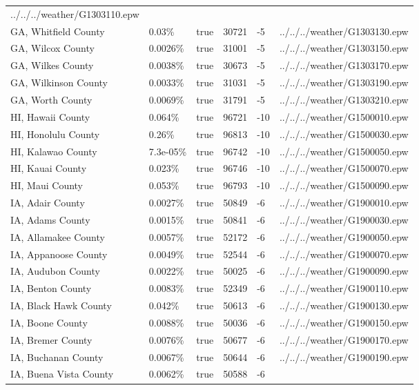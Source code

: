 \begin{longtable}[]{@{}llllll@{}}
../../../weather/G1303110.epw \\
GA, Whitfield County & 0.03\% & true & 30721 & -5 &
../../../weather/G1303130.epw \\
GA, Wilcox County & 0.0026\% & true & 31001 & -5 &
../../../weather/G1303150.epw \\
GA, Wilkes County & 0.0038\% & true & 30673 & -5 &
../../../weather/G1303170.epw \\
GA, Wilkinson County & 0.0033\% & true & 31031 & -5 &
../../../weather/G1303190.epw \\
GA, Worth County & 0.0069\% & true & 31791 & -5 &
../../../weather/G1303210.epw \\
HI, Hawaii County & 0.064\% & true & 96721 & -10 &
../../../weather/G1500010.epw \\
HI, Honolulu County & 0.26\% & true & 96813 & -10 &
../../../weather/G1500030.epw \\
HI, Kalawao County & 7.3e-05\% & true & 96742 & -10 &
../../../weather/G1500050.epw \\
HI, Kauai County & 0.023\% & true & 96746 & -10 &
../../../weather/G1500070.epw \\
HI, Maui County & 0.053\% & true & 96793 & -10 &
../../../weather/G1500090.epw \\
IA, Adair County & 0.0027\% & true & 50849 & -6 &
../../../weather/G1900010.epw \\
IA, Adams County & 0.0015\% & true & 50841 & -6 &
../../../weather/G1900030.epw \\
IA, Allamakee County & 0.0057\% & true & 52172 & -6 &
../../../weather/G1900050.epw \\
IA, Appanoose County & 0.0049\% & true & 52544 & -6 &
../../../weather/G1900070.epw \\
IA, Audubon County & 0.0022\% & true & 50025 & -6 &
../../../weather/G1900090.epw \\
IA, Benton County & 0.0083\% & true & 52349 & -6 &
../../../weather/G1900110.epw \\
IA, Black Hawk County & 0.042\% & true & 50613 & -6 &
../../../weather/G1900130.epw \\
IA, Boone County & 0.0088\% & true & 50036 & -6 &
../../../weather/G1900150.epw \\
IA, Bremer County & 0.0076\% & true & 50677 & -6 &
../../../weather/G1900170.epw \\
IA, Buchanan County & 0.0067\% & true & 50644 & -6 &
../../../weather/G1900190.epw \\
IA, Buena Vista County & 0.0062\% & true & 50588 & -6 &

\end{longtable}
